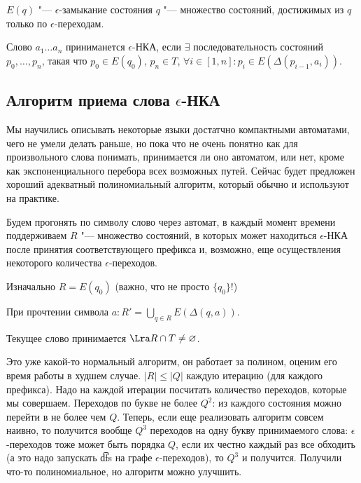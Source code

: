 \begin{Def}
$E(q)$ "--- $\epsilon$-замыкание состояния $q$ "--- множество состояний, достижимых из $q$ только по $\epsilon$-переходам.
\end{Def}


\begin{Def}
Слово $a_1 \dots a_n$ приниманется $\epsilon$-НКА, если $\exists$ последовательность состояний $p_0, \dots, p_n$, такая что
$p_0 \in E(q_0)$, $p_n \in T$, $\forall i \in [1, n]: p_i \in E(\Delta(p_{i-1}, a_i))$.
\end{Def}

\subsection{Алгоритм приема слова \texorpdfstring{$\epsilon$}{epsilon}-НКА}
Мы научились описывать некоторые языки достатчно компактными автоматами, чего не умели делать раньше, но пока что не очень понятно как для произвольного слова понимать, принимается ли оно автоматом, или нет,
кроме как экспоненциального перебора всех возможных путей. Сейчас будет предложен хороший адекватный полиномиальный алгоритм, который обычно и используют на практике.

Будем прогонять по символу слово через автомат, в каждый момент времени поддерживаем $R$ "---  множество состояний, в которых может находиться $\epsilon$-НКА после принятия соответствующего префикса и,
возможно, еще осуществления некоторого количества $\epsilon$-переходов. 

Изначально $R = E(q_0)$ (важно, что не просто $\{q_0\}$!)

При прочтении символа $a\colon R' =  \bigcup\limits_{q \in R} E(\Delta(q, a))$.

Текущее слово принимается $\Lra R \cap T \neq \varnothing$.

Это уже какой-то нормальный алгоритм, он работает за полином, оценим его время работы в худшем случае.
$|R| \leqslant |Q|$ каждую итерацию (для каждого префикса). 
Надо на каждой итерации посчитать количество переходов, которые мы совершаем.
Переходов по букве не более $Q^2$: из каждого состояния можно перейти в не более чем $Q$.
Теперь, если еще реализовать алгоритм совсем наивно, то получится вообще $Q^3$ переходов на одну букву принимаемого слова:
$\epsilon$-переходов тоже может быть порядка $Q$, если их честно каждый раз все обходить (а это надо запускать \t{dfs} на графе $\epsilon$-переходов), то $Q^3$ и получится.
Получили что-то полиномиальное, но алгоритм можно улучшить.

